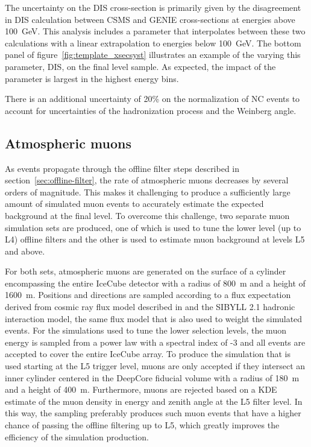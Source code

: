 The uncertainty on the DIS cross-section is primarily given by the disagreement in DIS calculation between CSMS and GENIE cross-sections at energies above 100~GeV. This analysis includes a parameter that interpolates between these two calculations with a linear extrapolation to energies below 100~GeV.
The bottom panel of figure~\ref{fig:template_xsecsyst} illustrates an example of the varying this parameter, DIS, on the final level sample. As expected, the impact of the parameter is largest in the highest energy bins.

There is an additional uncertainty of 20\% on the normalization of NC events to account for uncertainties of the hadronization process and the Weinberg angle.

\subsection{Atmospheric muons}
As events propagate through the offline filter steps described in section~\ref{sec:offline-filter}, the rate of atmospheric muons decreases by several orders of magnitude. This makes it challenging to produce a sufficiently large amount of simulated muon events to accurately estimate the expected background at the final level. To overcome this challenge, two separate muon simulation sets are produced, one of which is used to tune the lower level (up to L4) offline filters and the other is used to estimate muon background at levels L5 and above. 

For both sets, atmospheric muons are generated on the surface of a cylinder encompassing the entire IceCube detector with a radius of 800~m and a height of 1600~m. Positions and directions are sampled according to a flux expectation derived from cosmic ray flux model described in  and the \textsc{SIBYLL 2.1} hadronic interaction model, the same flux model that is also used to weight the simulated events. For the simulations used to tune the lower selection levels, the muon energy is sampled from a power law with a spectral index of -3 and all events are accepted to cover the entire IceCube array. To produce the simulation that is used starting at the L5 trigger level, muons are only accepted if they intersect an inner cylinder centered in the DeepCore fiducial volume with a radius of 180~m and a height of 400~m. Furthermore, muons are rejected based on a KDE estimate of the muon density in energy and zenith angle at the L5 filter level. In this way, the sampling preferably produces such muon events that have a higher chance of passing the offline filtering up to L5, which greatly improves the efficiency of the simulation production.


